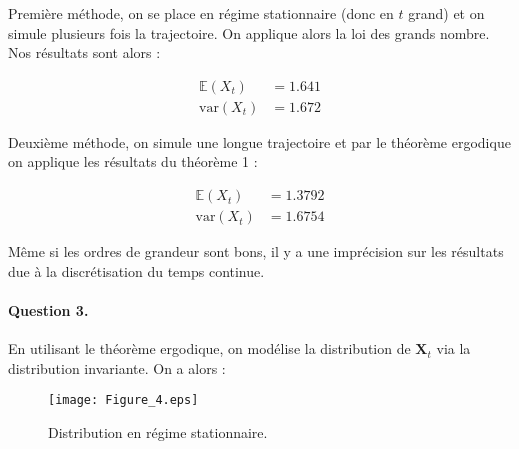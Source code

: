 \documentclass[12pt,a4paper]{article}
\begin{document}
Première méthode, on se place en régime stationnaire (donc en $t$ grand) et on simule plusieurs fois la trajectoire. On applique alors la loi des grands nombre. Nos résultats sont alors :

\begin{align*}
\mathbb{E}(X_t) &= 1.641 \\
\text{var}(X_t) &= 1.672
\end{align*}

Deuxième méthode, on simule une longue trajectoire et par le théorème ergodique on applique les résultats du théorème 1 :

\begin{align*}
\mathbb{E}(X_t) &= 1.3792 \\
\text{var}(X_t) &= 1.6754
\end{align*}

Même si les ordres de grandeur sont bons, il y a une imprécision sur les résultats due à la discrétisation du temps continue.

\paragraph*{Question 3.}

En utilisant le théorème ergodique, on modélise la distribution de $\mathbf{X}_t$ via la distribution invariante. On a alors :

\begin{figure}[H]
	\centering
	\texttt{[image: Figure\_4.eps]}
	\caption{Distribution en régime stationnaire.}
\end{figure}
\end{document}
